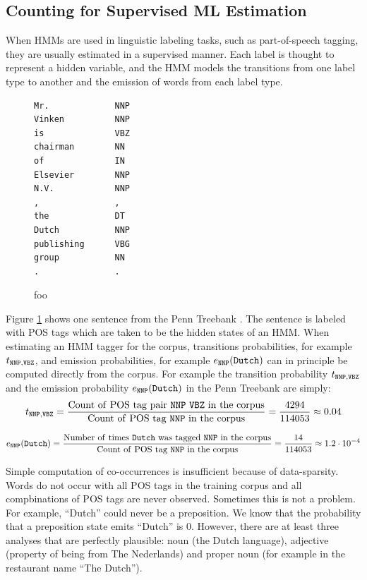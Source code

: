 \subsection{Counting for Supervised ML Estimation}

When HMMs are used in linguistic labeling tasks, such as
part-of-speech tagging, they are usually estimated in a supervised
manner. Each label is thought to represent a hidden variable, and the
HMM models the transitions from one label type to another and the
emission of words from each label type. 

\begin{figure}[!htb]
\begin{center}
\begin{BVerbatim}
Mr.             NNP
Vinken          NNP
is              VBZ
chairman        NN
of              IN
Elsevier        NNP
N.V.            NNP
,               ,
the             DT
Dutch           NNP
publishing      VBG
group           NN
.               .
\end{BVerbatim}
\end{center}
\caption{foo}\label{penn-figure}
\end{figure}

Figure \ref{penn-figure} shows one sentence from the Penn Treebank \citep{Marcus1993}. The sentence is labeled with POS tags which are taken to be the hidden states of an HMM. When estimating an HMM tagger for the corpus, transitions probabilities, for example $t_{{\tt NNP}, {\tt VBZ}}$, and emission probabilities, for example $e_{{\tt NNP}}({\tt Dutch})$ can in principle be computed directly from the corpus. For example the transition probability $t_{{\tt NNP}, {\tt VBZ}}$ and the emission probability $e_{{\tt NNP}}({\tt Dutch})$ in the Penn Treebank are simply:
$$t_{{\tt NNP}, {\tt VBZ}} = \frac{{\rm Count\ of\ POS\ tag\ pair\ {\tt NNP}\ {\tt VBZ}\ in\ the\ corpus}}{{\rm Count\ of\ POS\ tag\ {\tt NNP}\ in\ the\ corpus}} = \frac{4294}{114053} \approx 0.04$$

$$e_{{\tt NNP}}({\tt Dutch}) = \frac{{\rm Number\ of\ times\ {\tt Dutch}\ was\ tagged\ {\tt NNP}\ in\ the\ corpus}}{{\rm Count\ of\ POS\ tag\ {\tt NNP}\ in\ the\ corpus}} = \frac{14}{114053} \approx 1.2 \cdot 10^{-4}$$

Simple computation of co-occurrences is insufficient because of
data-sparsity. Words do not occur with all POS tags in the training
corpus and all compbinations of POS tags are never observed. Sometimes
this is not a problem. For example, ``Dutch'' could never be a
preposition. We know that the probability that a preposition state
emits ``Dutch'' is $0$. However, there are at least three analyses
that are perfectly plausible: noun (the Dutch language), adjective
(property of being from The Nederlands) and proper noun (for example
in the restaurant name ``The Dutch'').

